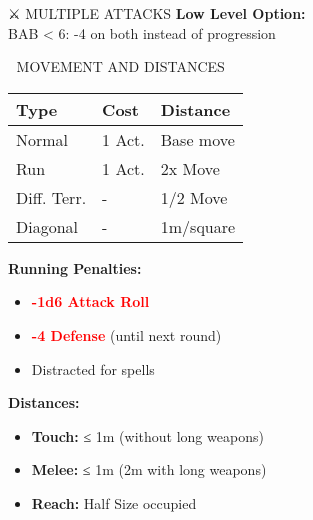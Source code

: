 \documentclass[10pt,a4paper,landscape]{article}
\newcommand{\critical}[1]{\textcolor{red}{\textbf{#1}}}
\begin{document}
\begin{multicols}{4}
\begin{mainsection}{⚔️ MULTIPLE ATTACKS}
			\textbf{Low Level Option:}\\
			BAB < 6: -4 on both instead of progression
		\end{mainsection}
		
		\begin{mainsection}{🏃 MOVEMENT AND DISTANCES}
			\begin{tabular}{@{}p{2cm}p{1cm}p{2.5cm}@{}}
				\toprule
				\textbf{Type} & \textbf{Cost} & \textbf{Distance} \\
				\midrule
				Normal & 1 Act. & Base move \\
				Run & 1 Act. & 2x Move \\
				Diff. Terr. & - & 1/2 Move \\
				Diagonal & - & 1m/square \\
				\bottomrule
			\end{tabular}
			
			\textbf{Running Penalties:}
			\begin{itemize}[noitemsep,leftmargin=8pt]
				\item \critical{-1d6 Attack Roll}
				\item \critical{-4 Defense} (until next round)
				\item Distracted for spells
			\end{itemize}
			
			\textbf{Distances:}
			\begin{itemize}[noitemsep,leftmargin=8pt]
				\item \textbf{Touch:} ≤ 1m (without long weapons)
				\item \textbf{Melee:} ≤ 1m (2m with long weapons)
				\item \textbf{Reach:} Half Size occupied
			\end{itemize}
		\end{mainsection}
		
		\columnbreak
		

\end{multicols}
\end{document}
